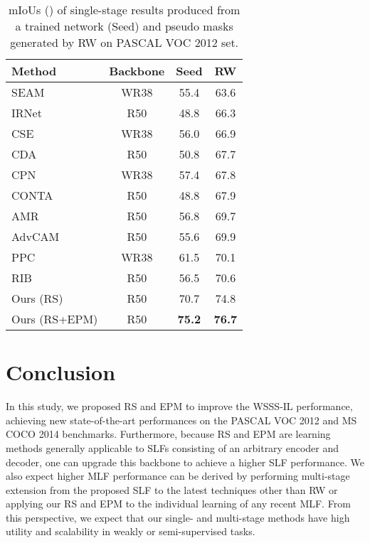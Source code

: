 \documentclass[11pt]{article}
\begin{document}
\begin{table}
\caption{
    mIoUs () of single-stage results produced from a trained network (Seed) and pseudo masks generated by RW on PASCAL VOC 2012  set. }
\centering
  \begin{scriptsize} 
  \begin{tabular}{p{} c c c}
    \toprule
    Method & Backbone & Seed & RW \\
    \hline \hline
    SEAM \cite{wang2020self} & WR38 & 55.4 & 63.6 \\
    IRNet \cite{ahn2019weakly} & R50 & 48.8 & 66.3 \\
    CSE \cite{kweon2021unlocking} & WR38 & 56.0 & 66.9 \\
    CDA \cite{su2021context} & R50 & 50.8 & 67.7 \\
    CPN \cite{zhang2021complementary} & WR38 & 57.4 & 67.8 \\
    CONTA \cite{zhang2020causal} & R50 & 48.8 & 67.9 \\
    AMR \cite{qin2021activation} & R50 & 56.8 & 69.7 \\
    AdvCAM \cite{lee2021anti} & R50 & 55.6 & 69.9 \\
    PPC \cite{du2022weakly} & WR38 & 61.5 & 70.1 \\
    RIB \cite{lee2021reducing} & R50 & 56.5 & 70.6 \\ 
Ours (RS) & R50 & 70.7 & 74.8 \\
Ours (RS+EPM) & R50 & \textbf{75.2} & \textbf{76.7} \\
    \bottomrule
  \end{tabular}
  \label{tab:rw}
  \end{scriptsize}
  \vspace{-3mm}
\end{table}

\section{Conclusion}
\label{section:conc}
{In this study, we proposed RS and EPM to improve the WSSS-IL performance, achieving new state-of-the-art performances on the PASCAL VOC 2012 and MS COCO 2014 benchmarks. Furthermore, because RS and EPM are learning methods generally applicable to SLFs consisting of an arbitrary encoder and decoder, one can upgrade this backbone to achieve a higher SLF performance. We also expect higher MLF performance can be derived by performing multi-stage extension from the proposed SLF to the latest techniques other than RW or applying our RS and EPM to the individual learning of any recent MLF.  
From this perspective, we expect that our single- and multi-stage methods have high utility and scalability in weakly or semi-supervised tasks.}
 
\end{document}
